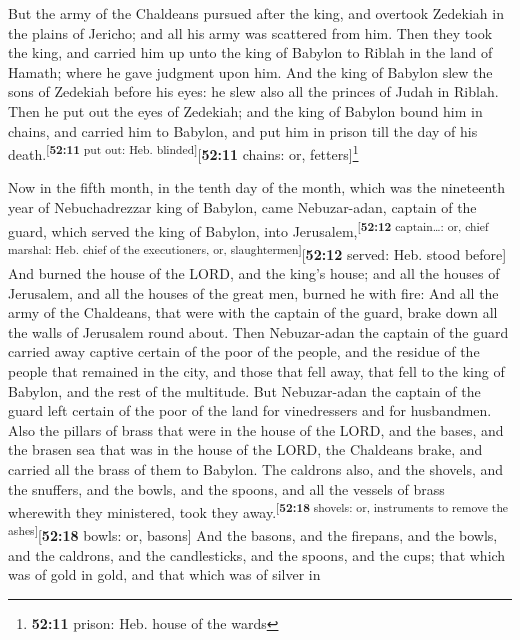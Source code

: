  But the army of the Chaldeans pursued after the king, and
overtook Zedekiah in the plains of Jericho; and all his army was
scattered from him.  Then they took the king, and carried
him up unto the king of Babylon to Riblah in the land of Hamath; where
he gave judgment upon him.  And the king of Babylon slew
the sons of Zedekiah before his eyes: he slew also all the princes of
Judah in Riblah.  Then he put out the eyes of Zedekiah;
and the king of Babylon bound him in chains, and carried him to Babylon,
and put him in prison till the day of his
death.\textsuperscript{{[}\textbf{52:11} put out: Heb.
blinded{]}}{[}\textbf{52:11} chains: or, fetters{]}\footnote{\textbf{52:11}
  prison: Heb. house of the wards}

 Now in the fifth month, in the tenth day of the month,
which was the nineteenth year of Nebuchadrezzar king of Babylon, came
Nebuzar-adan, captain of the guard, which served the king of Babylon,
into Jerusalem,\textsuperscript{{[}\textbf{52:12} captain\ldots: or,
chief marshal: Heb. chief of the executioners, or,
slaughtermen{]}}{[}\textbf{52:12} served: Heb. stood before{]}
 And burned the house of the LORD, and the king's house;
and all the houses of Jerusalem, and all the houses of the great men,
burned he with fire:  And all the army of the Chaldeans,
that were with the captain of the guard, brake down all the walls of
Jerusalem round about.  Then Nebuzar-adan the captain of
the guard carried away captive certain of the poor of the people, and
the residue of the people that remained in the city, and those that fell
away, that fell to the king of Babylon, and the rest of the multitude.
 But Nebuzar-adan the captain of the guard left certain
of the poor of the land for vinedressers and for husbandmen.
 Also the pillars of brass that were in the house of the
LORD, and the bases, and the brasen sea that was in the house of the
LORD, the Chaldeans brake, and carried all the brass of them to Babylon.
 The caldrons also, and the shovels, and the snuffers,
and the bowls, and the spoons, and all the vessels of brass wherewith
they ministered, took they away.\textsuperscript{{[}\textbf{52:18}
shovels: or, instruments to remove the ashes{]}}{[}\textbf{52:18} bowls:
or, basons{]}  And the basons, and the firepans, and the
bowls, and the caldrons, and the candlesticks, and the spoons, and the
cups; that which was of gold in gold, and that which was of silver in
